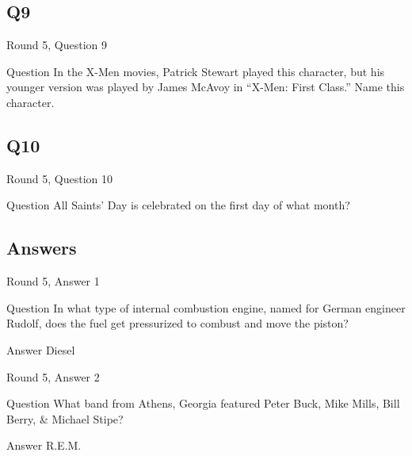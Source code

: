 \documentclass[11pt]{beamer}
\begin{document}
\subsection*{Q9}
\begin{frame}[t]{Round 5, Question 9}
\vspace{2em}
\begin{block}{Question}
In the X-Men movies, Patrick Stewart played this character, but his younger version was played by James McAvoy in ``X-Men: First Class.'' Name this character.
\end{block}
\end{frame}
    

\subsection*{Q10}
\begin{frame}[t]{Round 5, Question 10}
\vspace{2em}
\begin{block}{Question}
All Saints' Day is celebrated on the first day of what month\@?
\end{block}
\end{frame}
    
\subsection{Answers}

\begin{frame}[t]{Round 5, Answer 1}
\vspace{2em}
\begin{block}{Question}
In what type of internal combustion engine, named for German engineer Rudolf, does the fuel get pressurized to combust and move the piston\@?
\end{block}
\pause{}
\begin{block}{Answer}
Diesel
\end{block}
\end{frame}
    

\begin{frame}[t]{Round 5, Answer 2}
\vspace{2em}
\begin{block}{Question}
What band from Athens, Georgia featured Peter Buck, Mike Mills, Bill Berry, \& Michael Stipe\@?
\end{block}
\pause{}
\begin{block}{Answer}
R.E.M.
\end{block}
\end{frame}
    
\end{document}
